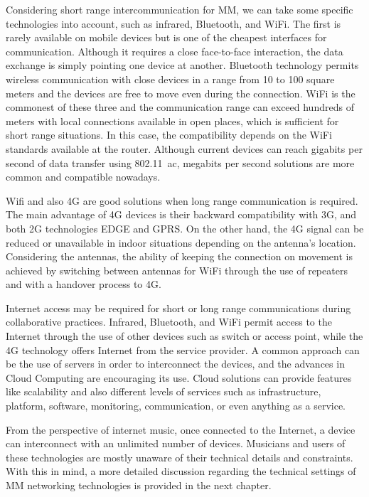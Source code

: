 Considering short range intercommunication for MM, we can take some specific technologies into account, such as infrared, Bluetooth, and WiFi.
The first is rarely available on mobile devices but is one of the cheapest interfaces for communication.
Although it requires a close face-to-face interaction, the data exchange is simply pointing one device at another.
Bluetooth technology permits wireless communication with close devices in a range from 10 to 100 square meters and the devices are free to move even during the connection.
WiFi is the commonest of these three and the communication range can exceed hundreds of meters with local connections available in open places, which is sufficient for short range situations.
In this case, the compatibility depends on the WiFi standards available at the router. 
Although current devices can reach gigabits per second of data transfer using 802.11~ac, megabits per second solutions are more common and compatible nowadays.

Wifi and also 4G are good solutions when long range communication is required.
The main advantage of 4G devices is their backward compatibility with 3G, and both 2G technologies EDGE and GPRS.
On the other hand, the 4G signal can be reduced or unavailable in indoor situations depending on the antenna's location.
Considering the antennas, the ability of keeping the connection on movement is achieved by switching between antennas for WiFi through the use of repeaters and with a handover process to 4G.

Internet access may be required for short or long range communications during collaborative practices.
Infrared, Bluetooth, and WiFi permit access to the Internet through the use of other devices such as switch or access point, while the 4G technology offers Internet from the service provider.
A common approach can be the use of servers in order to interconnect the devices, and the advances in Cloud Computing are encouraging its use.
Cloud solutions can provide features like scalability and also different levels of services such as infrastructure, platform, software, monitoring, communication, or even anything as a service.

From the perspective of internet music, once connected to the Internet, a device can interconnect with an unlimited number of devices.
Musicians and users of these technologies are mostly unaware of their technical details and constraints.
With this in mind, a more detailed discussion regarding the technical settings of MM networking technologies is provided in the next chapter.